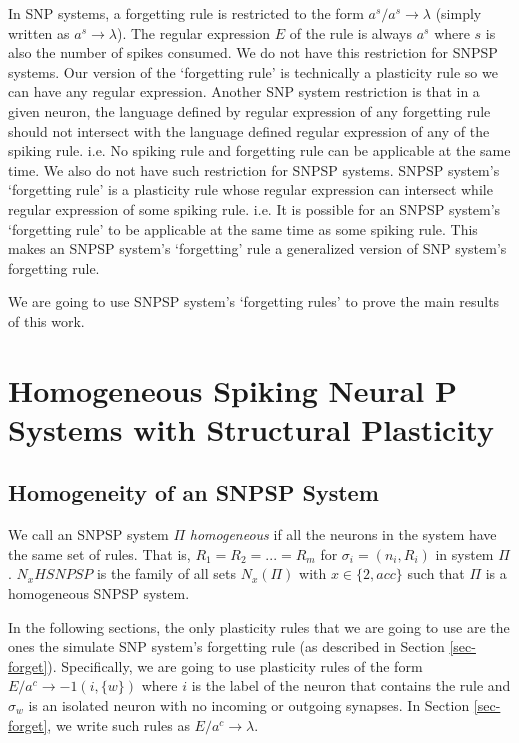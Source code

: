 \documentclass[smallextended]{svjour3}
\begin{document}
In SNP systems, a forgetting rule is restricted to the form $a^s/a^s \rightarrow \lambda$ (simply written as $a^s \rightarrow \lambda$). The regular
expression $E$ of the rule is always $a^s$ where $s$ is also the number of spikes consumed. We do not have this restriction for SNPSP systems. Our 
version of the `forgetting rule' is technically a plasticity rule so we can have any regular expression. Another SNP system restriction is that in a 
given neuron, the language defined by regular expression of any forgetting rule should not intersect with the language defined regular expression of 
any of the spiking rule. i.e. No spiking rule and forgetting rule can be applicable at the same time. We also do not have such restriction for SNPSP
systems. SNPSP system's `forgetting rule' is a plasticity rule whose regular expression can intersect while regular expression of some spiking rule.
i.e. It is possible for an SNPSP system's `forgetting rule' to be applicable at the same time as some spiking rule. This makes an SNPSP system's 
`forgetting' rule a generalized version of SNP system's forgetting rule.

We are going to use SNPSP system's `forgetting rules' to prove the main results of this work.


\section{Homogeneous Spiking Neural P Systems with Structural Plasticity} \label{homogeneous-snpsp}


\subsection{Homogeneity of an SNPSP System}

We call an SNPSP system $\Pi$ \textit{homogeneous} if all the neurons in the system have the same set of rules. That is, $R_1 = R_2 = ... = R_m$
for $\sigma_i = (n_i, R_i)$ in system $\Pi$. $N_xHSNPSP$ is the family of all sets $N_x(\Pi)$ with $x \in \{2, acc\}$ such that $\Pi$ is a homogeneous
SNPSP system.  

In the following sections, the only plasticity rules that we are going to use are the ones the simulate SNP system's forgetting rule (as described in
Section \ref{sec-forget}). Specifically, we are going to use plasticity rules of the form $E/a^c \rightarrow -1(i,\{w\})$ where $i$ is the label of
the neuron that contains the rule and $\sigma_w$ is an isolated neuron with no incoming or outgoing synapses. In Section \ref{sec-forget}, we write
such rules as $E/a^c \rightarrow \lambda$. 
\end{document}
